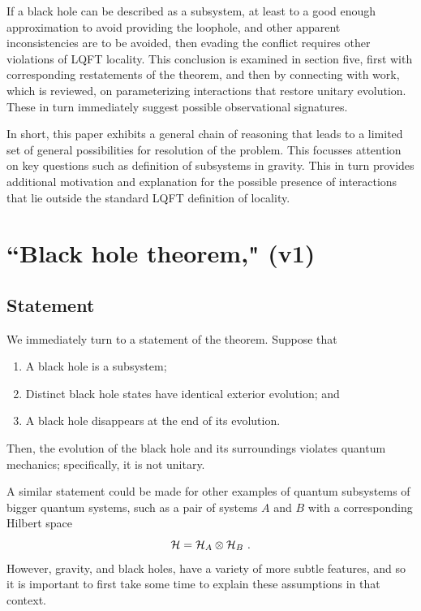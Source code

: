 \documentclass[12pt]{article}
\numberwithin{equation}{section}
\newcommand{\beq}{\begin{equation}}
\newcommand{\eeq}{\end{equation}}
\begin{document}
If a black hole can be described as a subsystem, at least to a good enough approximation to avoid providing the loophole, and other apparent inconsistencies are to be avoided, then evading the conflict requires other violations of LQFT locality.  This conclusion is examined in section five, first with corresponding restatements of the theorem, and then by connecting with work, which is reviewed, on parameterizing interactions that restore  unitary evolution.  These in turn immediately suggest possible observational signatures. 

In short, this paper exhibits a general chain of reasoning that leads to a limited set of general possibilities for resolution of the problem.  This focusses attention on key questions such as definition of subsystems in gravity.  This in turn provides additional motivation and explanation for  
 the possible presence of interactions that lie outside the standard LQFT definition of locality.  





\section{``Black hole theorem," (v1)}




\subsection{Statement}\label{statement}

We immediately turn to a statement of the theorem.  Suppose that 
\begin{enumerate}
\item A black hole is a subsystem;
\item Distinct black hole states have identical exterior evolution; and
\item A black hole disappears at the end of its evolution.
\end{enumerate}

Then, the evolution of the black hole  and its surroundings violates quantum mechanics; specifically, it is not unitary.

A similar statement could be made for other examples of quantum subsystems of bigger quantum systems, such as a pair of systems $A$ and $B$ with a corresponding Hilbert space
\beq\label{Hprod}
{\cal H}={\cal H}_A\otimes{\cal H}_B\ .
\eeq
However, gravity, and black holes, have a variety of more subtle features, and so it is important to first take some time to explain these assumptions in that context.
\end{document}
